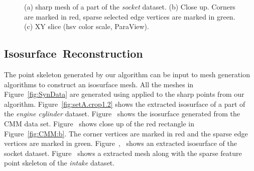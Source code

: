 \begin{figure}[tb]
    \centering
    \caption{ (a) sharp mesh of a part of the \textit{socket} dataset. 
        (b) Close up. Corners are marked in red, sparse selected edge vertices are marked in green. (c) XY slice (hsv color scale, ParaView).}
    \label{fig:socket}
\end{figure}

\subsection{\mbox{Isosurface Reconstruction}}

The point skeleton generated by our algorithm can be input to mesh generation algorithms
to construct an isosurface mesh.
All the meshes  in Figure~\ref{fig:SynData} are generated using \MergeSharp applied
to the sharp points from our algorithm.
Figure~\ref{fig:setA.crop1.2} shows the extracted isosurface of a part of the \emph{engine cylinder} dataset.
  Figure~ shows the isosurface generated from the CMM data set. Figure~ shows close up of the red rectangle in Figure~\ref{fig:CMM:b}. The corner vertices are marked in red and the sparse edge vertices are marked in green. Figure~,~ shows an extracted isosurface of the socket dataset. Figure~ shows a \MergeSharp extracted mesh along with the sparse feature point skeleton of the \emph{intake} dataset.

